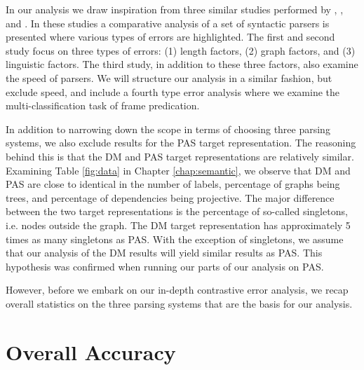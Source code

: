
In our analysis we draw inspiration from three similar studies performed by , , and . In these studies a comparative analysis of a set of syntactic parsers is presented where various types of errors are highlighted. The first and second study focus on three types of errors: (1) length factors, (2) graph factors, and (3) linguistic factors. The third study, in addition to these three factors, also examine the speed of parsers. We will structure our analysis in a similar fashion, but exclude speed, and include a fourth type error analysis where we examine the multi-classification task of frame predication.

In addition to narrowing down the scope in terms of choosing three parsing systems, we also exclude results for the PAS target representation. The reasoning behind this is that the DM and PAS target representations are relatively similar. Examining Table \ref{fig:data} in Chapter \ref{chap:semantic}, we observe that DM and PAS are close to identical in the number of labels, percentage of graphs being trees, and percentage of dependencies being projective. The major difference between the two target representations is the percentage of so-called singletons, i.e. nodes outside the graph. The DM target representation has approximately 5 times as many singletons as PAS. With the exception of singletons, we assume that our analysis of the DM results will yield similar results as PAS. This hypothesis was confirmed when running our parts of our analysis on PAS.

However, before we embark on our in-depth contrastive error analysis, we recap overall statistics on the three parsing systems that are the basis for our analysis.

\section{Overall Accuracy}

